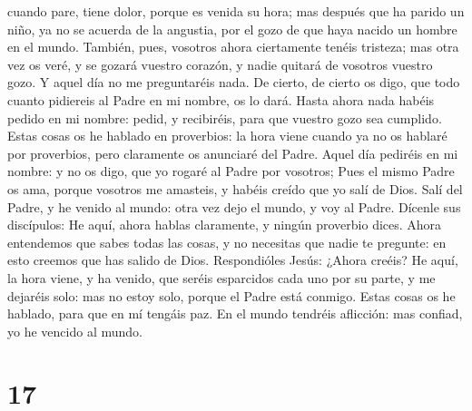 cuando pare, tiene dolor, porque es venida su hora; mas después que ha
parido un niño, ya no se acuerda de la angustia, por el gozo de que haya
nacido un hombre en el mundo.  También, pues, vosotros
ahora ciertamente tenéis tristeza; mas otra vez os veré, y se gozará
vuestro corazón, y nadie quitará de vosotros vuestro gozo.
 Y aquel día no me preguntaréis nada. De cierto, de
cierto os digo, que todo cuanto pidiereis al Padre en mi nombre, os lo
dará.  Hasta ahora nada habéis pedido en mi nombre:
pedid, y recibiréis, para que vuestro gozo sea cumplido. 
Estas cosas os he hablado en proverbios: la hora viene cuando ya no os
hablaré por proverbios, pero claramente os anunciaré del Padre.
 Aquel día pediréis en mi nombre: y no os digo, que yo
rogaré al Padre por vosotros;  Pues el mismo Padre os
ama, porque vosotros me amasteis, y habéis creído que yo salí de Dios.
 Salí del Padre, y he venido al mundo: otra vez dejo el
mundo, y voy al Padre.  Dícenle sus discípulos: He aquí,
ahora hablas claramente, y ningún proverbio dices.  Ahora
entendemos que sabes todas las cosas, y no necesitas que nadie te
pregunte: en esto creemos que has salido de Dios. 
Respondióles Jesús: ¿Ahora creéis?  He aquí, la hora
viene, y ha venido, que seréis esparcidos cada uno por su parte, y me
dejaréis solo: mas no estoy solo, porque el Padre está conmigo.
 Estas cosas os he hablado, para que en mí tengáis paz.
En el mundo tendréis aflicción: mas confiad, yo he vencido al mundo.

\hypertarget{section-16}{%
\section{17}\label{section-16}}

